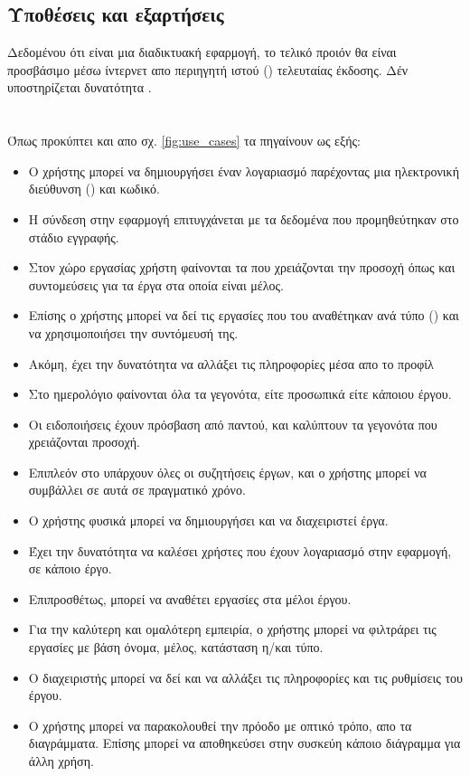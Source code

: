 \subsection*{Υποθέσεις και εξαρτήσεις}
\pSpace Δεδομένου ότι είναι μια διαδικτυακή εφαρμογή, το τελικό προιόν θα είναι προσβάσιμο μέσω ίντερνετ απο περιηγητή ιστού () τελευταίας έκδοσης. Δέν υποστηρίζεται δυνατότητα .

\section{}
\subsection*{}
\pSpace Όπως προκύπτει και απο σχ. \ref{fig:use_cases} τα  πηγαίνουν ως εξής:
\begin{itemize}
	\item Ο χρήστης μπορεί να δημιουργήσει έναν λογαριασμό παρέχοντας μια ηλεκτρονική διεύθυνση () και κωδικό.
	\item Η σύνδεση στην εφαρμογή επιτυγχάνεται με τα δεδομένα που προμηθεύτηκαν στο στάδιο εγγραφής.
	\item Στον χώρο εργασίας χρήστη φαίνονται τα  που χρειάζονται την προσοχή όπως και συντομεύσεις για τα έργα στα οποία είναι μέλος.
	\item Επίσης ο χρήστης μπορεί να δεί τις εργασίες που του αναθέτηκαν ανά τύπο () και να χρησιμοποιήσει την συντόμευσή της.
	\item Ακόμη, έχει την δυνατότητα να αλλάξει τις πληροφορίες μέσα απο το προφίλ
	\item Στο ημερολόγιο φαίνονται όλα τα γεγονότα, είτε προσωπικά είτε κάποιου έργου.
	\item Οι ειδοποιήσεις έχουν πρόσβαση από παντού, και καλύπτουν τα γεγονότα που χρειάζονται προσοχή.
	\item Επιπλεόν στο  υπάρχουν όλες οι συζητήσεις έργων, και ο χρήστης μπορεί να συμβάλλει σε αυτά σε πραγματικό χρόνο.
	\item Ο χρήστης φυσικά μπορεί να δημιουργήσει και να διαχειριστεί έργα.
	\item Έχει την δυνατότητα να καλέσει χρήστες που έχουν λογαριασμό στην εφαρμογή, σε κάποιο έργο.
	\item Επιπροσθέτως, μπορεί να αναθέτει εργασίες στα μέλοι έργου.
	\item Για την καλύτερη και ομαλότερη εμπειρία, ο χρήστης μπορεί να φιλτράρει τις εργασίες με βάση όνομα, μέλος, κατάσταση η/και τύπο.
	\item Ο διαχειριστής μπορεί να δεί και να αλλάξει τις πληροφορίες και τις ρυθμίσεις του έργου.
	\item Ο χρήστης μπορεί να παρακολουθεί την πρόοδο με οπτικό τρόπο, απο τα διαγράμματα. Επίσης μπορεί να αποθηκεύσει στην συσκεύη κάποιο διάγραμμα για άλλη χρήση.
\end{itemize}

